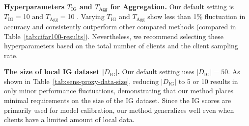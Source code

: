 \documentclass[sigconf]{acmart}
\newcommand{\progressbar}[1]{
    \raisebox{-0.7ex}{ %
        \begin{tikzpicture}[scale=1.2] %
            \fill[orange] (0,0) rectangle ({min(#1,100)*0.01},0.35); %
            \draw[thick, black] (0,0) rectangle (1,0.35); %
            \node[anchor=center] at (0.5, 0.175) {\textbf{\small #1\%}}; %
        \end{tikzpicture}
    }
}
\begin{document}
\textbf{Hyperparameters $T_{\text{IG}}$ and $T_{\text{Agg}}$ for Aggregation.} Our default setting is $T_{\text{IG}}=$10 and $T_{\text{Agg}}=$10 . Varying $T_{\text{IG}}$ and $T_{\text{Agg}}$ show less than 1\% fluctuation in accuracy and consistently outperform other compared methods (compared in Table~\ref{tab:cifar100-results}). Nevertheless, we recommend selecting these hyperparameters based on the total number of clients and the client sampling rate.

\textbf{The size of local IG dataset $|D_{\text{IG}}|$.}
Our default setting uses $|D_{\text{IG}}| = 50$. As shown in Table~\ref{tab:sens-proxy-data-size}, reducing $|D_{\text{IG}}|$ to 5 or 10 results in only minor performance fluctuations, demonstrating that our method places minimal requirements on the size of the IG dataset. Since the IG scores are primarily used for model calibration, our method generalizes well even when clients have a limited amount of local data.

    

\end{document}
